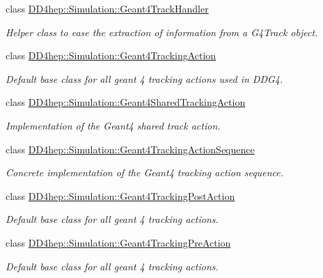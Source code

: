 \begin{DoxyCompactItemize}
class \hyperlink{class_d_d4hep_1_1_simulation_1_1_geant4_track_handler}{DD4hep::Simulation::Geant4TrackHandler}
\begin{DoxyCompactList}\small\item\em Helper class to ease the extraction of information from a G4Track object. \item\end{DoxyCompactList}\item 
class \hyperlink{class_d_d4hep_1_1_simulation_1_1_geant4_tracking_action}{DD4hep::Simulation::Geant4TrackingAction}
\begin{DoxyCompactList}\small\item\em Default base class for all geant 4 tracking actions used in DDG4. \item\end{DoxyCompactList}\item 
class \hyperlink{class_d_d4hep_1_1_simulation_1_1_geant4_shared_tracking_action}{DD4hep::Simulation::Geant4SharedTrackingAction}
\begin{DoxyCompactList}\small\item\em Implementation of the Geant4 shared track action. \item\end{DoxyCompactList}\item 
class \hyperlink{class_d_d4hep_1_1_simulation_1_1_geant4_tracking_action_sequence}{DD4hep::Simulation::Geant4TrackingActionSequence}
\begin{DoxyCompactList}\small\item\em Concrete implementation of the Geant4 tracking action sequence. \item\end{DoxyCompactList}\item 
class \hyperlink{class_d_d4hep_1_1_simulation_1_1_geant4_tracking_post_action}{DD4hep::Simulation::Geant4TrackingPostAction}
\begin{DoxyCompactList}\small\item\em Default base class for all geant 4 tracking actions. \item\end{DoxyCompactList}\item 
class \hyperlink{class_d_d4hep_1_1_simulation_1_1_geant4_tracking_pre_action}{DD4hep::Simulation::Geant4TrackingPreAction}
\begin{DoxyCompactList}\small\item\em Default base class for all geant 4 tracking actions. \item\end{DoxyCompactList}\item 

\end{DoxyCompactItemize}
